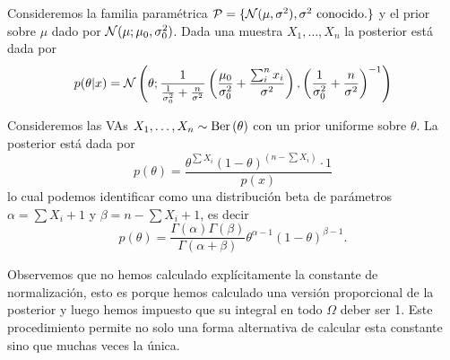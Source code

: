\begin{example}
	Consideremos la familia paramétrica ${\mathcal P}  = \{{\mathcal N}(\mu,\sigma^2), \sigma^2 \text{ conocido.}\}$ y el prior sobre $\mu$ dado por ${\mathcal N}(\mu; \mu_0,\sigma_0^2)$. Dada una muestra $X_1,\ldots,X_n$ la  posterior está dada por 
	\begin{align}
		p(\theta|x) = {\mathcal N}\left(\theta; \frac{1}{\frac{1}{\sigma^2_0}+\frac{n}{\sigma^2}}\left(\frac{\mu_0}{\sigma^2_0}+\frac{\sum_i^nx_i}{\sigma^2}\right),\left(\frac{1}{\sigma^2_0}+\frac{n}{\sigma^2}\right)^{-1}\right)
	\end{align}
\end{example}

\begin{example}
	Consideremos las VAs $X_1,\ldots,X_n \sim\text{Ber}\left(\theta\right)$ con un prior uniforme sobre $\theta$. La posterior está dada por 
	\begin{equation}
	 	p(\theta) = \frac{\theta^{\sum X_i}(1-\theta)^{(n-\sum X_i)}\cdot1}{p(x)} 
	 \end{equation} 
	 lo cual podemos identificar como una distribución beta de parámetros $\alpha = \sum X_i + 1$ y $\beta = n-\sum X_i +1 $, es decir 
	 \begin{equation}
	 	p(\theta) = \frac{\Gamma{(\alpha)}\Gamma{(\beta)}}{\Gamma{(\alpha + \beta)}} \theta^{\alpha - 1}(1-\theta)^{\beta - 1}.
	 \end{equation} 
\end{example}

\begin{remark}
	 Observemos que no hemos calculado explícitamente la constante de normalización, esto es porque hemos calculado una versión proporcional de la posterior y luego hemos impuesto que su integral en todo $\Omega$ deber ser 1. Este procedimiento permite no solo una forma alternativa de calcular esta constante sino que muchas veces la única. 
\end{remark}



